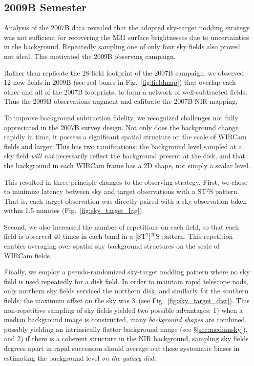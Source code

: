 \documentclass[iop]{emulateapj}
\newcommand{\Fig}[1]{Fig.~\ref{fig:#1}}  %
\newcommand{\Sec}[1]{\S\ref{sec:#1}}  %
\begin{document}
\subsection{2009B Semester}
\label{sub:obs9}

Analysis of the 2007B data revealed that the adopted sky-target nodding strategy was not sufficient for recovering the M31 surface brightnesses due to uncertainties in the background.
Repeatedly sampling one of only four sky fields also proved not ideal.
This motivated the 2009B observing campaign.

Rather than replicate the 28-field footprint of the 2007B campaign, we observed 12 new fields in 2009B (see red boxes in \Fig{fieldmap}) that overlap each other and all of the 2007B footprints, to form a network of well-subtracted fields.
Thus the 2009B observations augment and calibrate the 2007B NIR mapping.

To improve background subtraction fidelity, we recognized challenges not fully appreciated in the 2007B survey design.
Not only does the background change rapidly in time, it possess a significant spatial structure on the scale of WIRCam fields and larger.
This has two ramifications: the background level sampled at a sky field \emph{will not} necessarily reflect the background present at the disk, and that the background in each WIRCam frame has a 2D shape, not simply a scalar level.

This resulted in three principle changes to the observing strategy. First, we chose to minimize latency between sky and target observations with a ST$^2$S pattern. That is, each target observation was directly paired with a sky observation taken within 1.5 minutes (\Fig{sky_target_lag}).

Second, we also increased the number of repetitions on each field, so that each field is observed 40 times in each band in a [ST$^2$]$^{20}$S pattern. This repetition enables averaging over spatial sky background structures on the scale of WIRCam fields.

Finally, we employ a pseudo-randomized sky-target nodding pattern where no sky field is used repeatedly for a disk field.
In order to maintain rapid telescope nods, only northern sky fields serviced the northern disk, and similarly for the southern fields; the maximum offset on the sky was 3\arcdeg\ (see \Fig{sky_target_dist}).
This non-repetitive sampling of sky fields yielded two possible advantages: 1) when a median background image is constructed, many \emph{background shapes} are combined, possibly yielding an intrinsically flatter background image (see \Sec{mediansky}), and 2) if there is a coherent structure in the NIR background, sampling sky fields degrees apart in rapid succession should average out these systematic biases in estimating the background level \emph{on the galaxy disk}.
\end{document}
